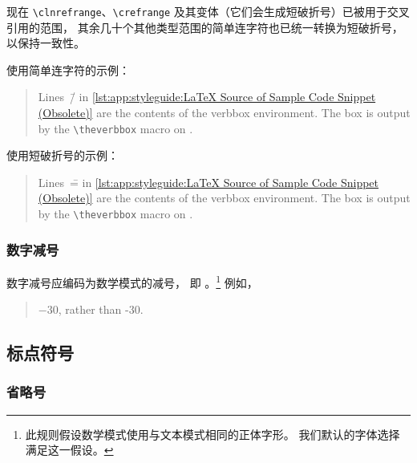 现在 \texttt{\textbackslash clnrefrange}、\texttt{\textbackslash crefrange}
及其变体（它们会生成短破折号）已被用于交叉引用的范围，
其余几十个其他类型范围的简单连字符也已统一转换为短破折号，
以保持一致性。

使用简单连字符的示例：

\begin{quote}
\begin{fcvref}
  Lines~\=/ in
  \cref{lst:app:styleguide:LaTeX Source of Sample Code Snippet (Obsolete)}
  are the contents of the verbbox environment.
  The box is output by the \texttt{\textbackslash theverbbox} macro on .
\end{fcvref}
\end{quote}

使用短破折号的示例：

\begin{quote}
\begin{fcvref}
  Lines~\== in
  \cref{lst:app:styleguide:LaTeX Source of Sample Code Snippet (Obsolete)}
  are the contents of the verbbox environment.
  The box is output by the \texttt{\textbackslash theverbbox} macro on .
\end{fcvref}
\end{quote}

\subsubsection{数字减号}
\label{sec:app:styleguide:Numerical Minus Sign}

数字减号应编码为数学模式的减号，
即 \qco{$-$}。\footnote{此规则假设数学模式使用与文本模式相同的正体字形。
  我们默认的字体选择满足这一假设。
}
例如，

\begin{quote}
  $-30$, rather than -30.
\end{quote}

\subsection{标点符号}
\label{sec:app:styleguide:Punctuation}

\subsubsection{省略号}
\label{sec:app:styleguide:Ellipsis}

